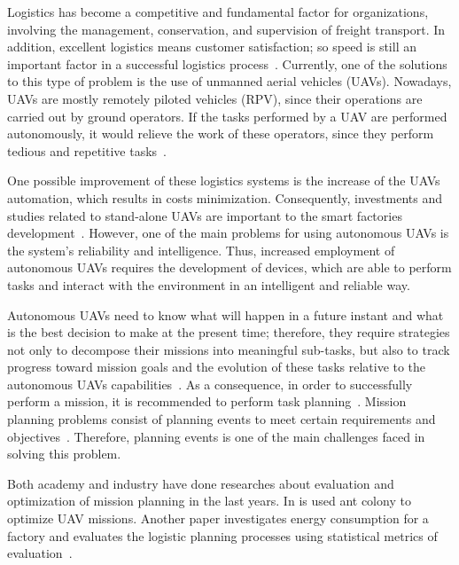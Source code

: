 \documentclass[conference]{IEEEtran}
\begin{document}

Logistics has become a competitive and fundamental factor for organizations, involving the management, conservation, and supervision of freight transport. In addition, excellent logistics means customer satisfaction; so speed is still an important factor in a successful logistics process~\cite{drone4logistic}. Currently, one of the solutions to this type of problem is the use of unmanned aerial vehicles (UAVs). Nowadays, UAVs are mostly remotely piloted vehicles (RPV), since their operations are carried out by ground operators. If the tasks performed by a UAV are performed autonomously, it would relieve the work of these operators, since they perform tedious and repetitive tasks~\cite{pascarella2013autonomic}.

One possible improvement of these logistics systems is the increase of the UAVs automation, which results in costs minimization. Consequently, investments and studies related to stand-alone UAVs are important to the smart factories development~\cite{hern2014dhl}. However, one of the main problems for using autonomous UAVs is the system's reliability and intelligence. Thus, increased employment of autonomous UAVs requires the development of devices, which are able to perform tasks and interact with the environment in an intelligent and reliable way.

Autonomous UAVs need to know what will happen in a future instant and what is the best decision to make at the present time; therefore, they require strategies not only to decompose their missions into meaningful sub-tasks, but also to track progress toward mission goals and the evolution of these tasks relative to the autonomous UAVs capabilities~\cite{finn2012developments}. As a consequence, in order to successfully perform a mission, it is recommended to perform task planning~\cite{finn2012developments}. Mission planning problems consist of planning events to meet certain requirements and objectives~\cite{krozel1988search}. Therefore, planning events is one of the main challenges faced in solving this problem.

Both academy and industry have done researches about evaluation and optimization of mission planning in the last years. In \cite{schwarz2012towards} is used ant colony to optimize UAV missions. Another paper investigates energy consumption for a factory and evaluates the logistic planning processes using statistical metrics of evaluation~\cite{muller2012analyzing}.
\end{document}
